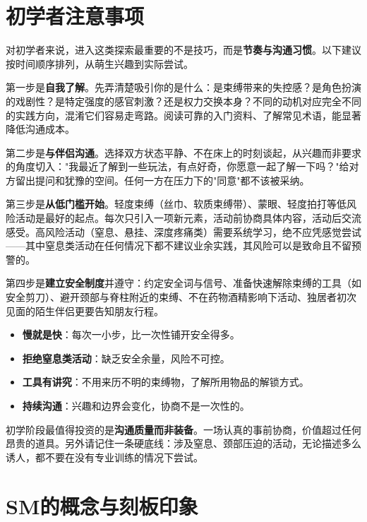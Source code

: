 \documentclass[12pt,UTF8]{ctexbook}
\newcommand{\keyword}[1]{\textbf{#1}}
\begin{document}
\section{初学者注意事项}

对初学者来说，进入这类探索最重要的不是技巧，而是\keyword{节奏与沟通习惯}。以下建议按时间顺序排列，从萌生兴趣到实际尝试。

第一步是\keyword{自我了解}。先弄清楚吸引你的是什么：是束缚带来的失控感？是角色扮演的戏剧性？是特定强度的感官刺激？还是权力交换本身？不同的动机对应完全不同的实践方向，混淆它们容易走弯路。阅读可靠的入门资料、了解常见术语，能显著降低沟通成本。

第二步是\keyword{与伴侣沟通}。选择双方状态平静、不在床上的时刻谈起，从兴趣而非要求的角度切入："我最近了解到一些玩法，有点好奇，你愿意一起了解一下吗？"给对方留出提问和犹豫的空间。任何一方在压力下的"同意"都不该被采纳。

第三步是\keyword{从低门槛开始}。轻度束缚（丝巾、软质束缚带）、蒙眼、轻度拍打等低风险活动是最好的起点。每次只引入一项新元素，活动前协商具体内容，活动后交流感受。高风险活动（窒息、悬挂、深度疼痛类）需要系统学习，绝不应凭感觉尝试——其中窒息类活动在任何情况下都不建议业余实践，其风险可以是致命且不留预警的。

第四步是\keyword{建立安全制度}并遵守：约定安全词与信号、准备快速解除束缚的工具（如安全剪刀）、避开颈部与脊柱附近的束缚、不在药物酒精影响下活动、独居者初次见面的陌生伴侣更要告知朋友行程。

\begin{itemize}
  \item \keyword{慢就是快}：每次一小步，比一次性铺开安全得多。
  \item \keyword{拒绝窒息类活动}：缺乏安全余量，风险不可控。
  \item \keyword{工具有讲究}：不用来历不明的束缚物，了解所用物品的解锁方式。
  \item \keyword{持续沟通}：兴趣和边界会变化，协商不是一次性的。
\end{itemize}

\begin{tcolorbox}[colback=pink!5!white,colframe=red!50!black,title=贴心小叮咛]
初学阶段最值得投资的是\keyword{沟通质量而非装备}。一场认真的事前协商，价值超过任何昂贵的道具。另外请记住一条硬底线：涉及窒息、颈部压迫的活动，无论描述多么诱人，都不要在没有专业训练的情况下尝试。
\end{tcolorbox}

\section{SM的概念与刻板印象}
\end{document}
